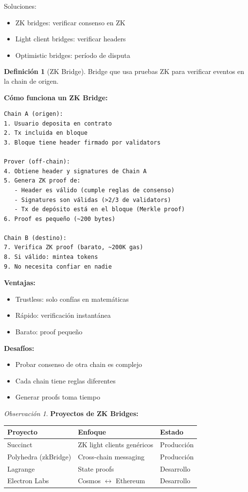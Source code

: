 \documentclass[11pt,a4paper,twoside,openright]{book}
\theoremstyle{definition}
\newtheorem{definition}{Definición}[chapter]
\theoremstyle{plain}
\theoremstyle{remark}
\newtheorem{remark}{Observación}[chapter]
\begin{document}
Soluciones:
\begin{itemize}
    \item ZK bridges: verificar consenso en ZK
    \item Light client bridges: verificar headers
    \item Optimistic bridges: período de disputa
\end{itemize}

\begin{definition}[ZK Bridge]
Bridge que usa pruebas ZK para verificar eventos en la chain de origen.
\end{definition}

\begin{mathnote}
\textbf{Cómo funciona un ZK Bridge:}

\begin{verbatim}
Chain A (origen):
1. Usuario deposita en contrato
2. Tx incluida en bloque
3. Bloque tiene header firmado por validators

Prover (off-chain):
4. Obtiene header y signatures de Chain A
5. Genera ZK proof de:
   - Header es válido (cumple reglas de consenso)
   - Signatures son válidas (>2/3 de validators)
   - Tx de depósito está en el bloque (Merkle proof)
6. Proof es pequeño (~200 bytes)

Chain B (destino):
7. Verifica ZK proof (barato, ~200K gas)
8. Si válido: mintea tokens
9. No necesita confiar en nadie
\end{verbatim}

\textbf{Ventajas:}
\begin{itemize}
    \item Trustless: solo confías en matemáticas
    \item Rápido: verificación instantánea
    \item Barato: proof pequeño
\end{itemize}

\textbf{Desafíos:}
\begin{itemize}
    \item Probar consenso de otra chain es complejo
    \item Cada chain tiene reglas diferentes
    \item Generar proofs toma tiempo
\end{itemize}
\end{mathnote}

\begin{remark}
\textbf{Proyectos de ZK Bridges:}

\begin{center}
\begin{tabular}{lll}
\toprule
\textbf{Proyecto} & \textbf{Enfoque} & \textbf{Estado} \\
\midrule
Succinct & ZK light clients genéricos & Producción \\
Polyhedra (zkBridge) & Cross-chain messaging & Producción \\
Lagrange & State proofs & Desarrollo \\
Electron Labs & Cosmos $\leftrightarrow$ Ethereum & Desarrollo \\
\bottomrule
\end{tabular}
\end{center}
\end{remark}
\end{document}
